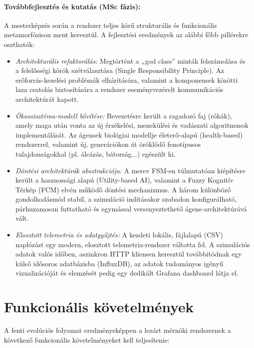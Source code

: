     \paragraph{Továbbfejlesztés és kutatás (MSc fázis):} A mesterképzés során a rendszer teljes körű strukturális és funkcionális metamorfózison ment keresztül. A fejlesztési eredmények az alábbi főbb pillérekre oszthatók:
    \begin{itemize}
        \item \textit{Architekturális refaktorálás:} Megtörtént a „god class” minták felszámolása és a felelősségi körök szétválasztása (Single Responsibility Principle). Az erőforrás-kezelési problémák elhárítására, valamint a komponensek közötti laza csatolás biztosítására a rendszer eseményvezérelt kommunikációs architektúrát kapott.
        \item \textit{Ökoszisztéma-modell bővítése:} Bevezetésre került a ragadozó faj (rókák), amely maga után vonta az új érzékelési, menekülési és vadászati algoritmusok implementálását. Az ágensek biológiai modellje életerő-alapú (health-based) rendszerrel, valamint új, generációkon át öröklődő fenotípusos tulajdonságokkal (pl. álcázás, bátorság...) egészült ki.
        \item \textit{Döntési architektúrák absztrakciója:} A merev FSM-en túlmutatóan kiépítésre került a hasznossági alapú (Utility-based AI), valamint a Fuzzy Kognitív Térkép (FCM) elvén működő döntési mechanizmus. A három különböző gondolkodásmód stabil, a szimuláció indításakor szabadon konfigurálható, párhuzamosan futtatható és egymással versenyeztethető ágens-architektúrává vált.
        \item \textit{Elosztott telemetria és adatgyűjtés:} A kezdeti lokális, fájlalapú (CSV) naplózást egy modern, elosztott telemetria-rendszer váltotta fel. A szimulációs adatok valós időben, aszinkron HTTP kliensen keresztül továbbítódnak egy külső idősoros adatbázisba (InfluxDB), az adatok tudományos igényű vizualizációját és elemzését pedig egy dedikált Grafana dashboard látja el.
    \end{itemize}

\section{Funkcionális követelmények}

A fenti evolúciós folyamat eredményeképpen a lezárt mérnöki rendszernek a következő funkcionális követelményeket kell teljesítenie:

